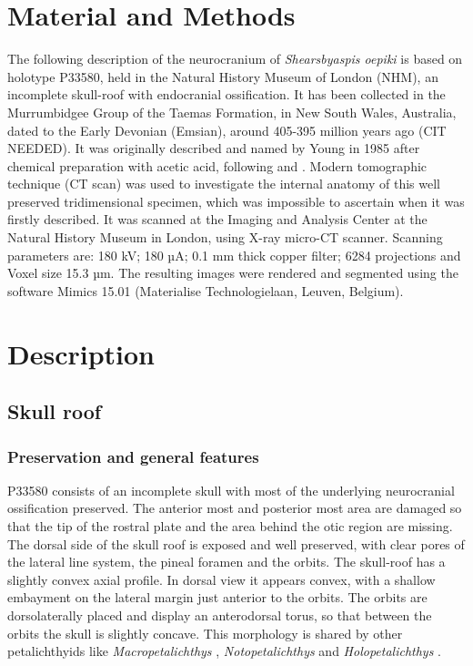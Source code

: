 \documentclass[12pt,letterpaper]{article}
\begin{document}
\section{Material and Methods}
The following description of the neurocranium of \textit{Shearsbyaspis oepiki} \citealt{Young1985} is based on holotype P33580, held in the Natural History Museum of London (NHM), an incomplete skull-roof with endocranial ossification. It has been collected in the Murrumbidgee Group of the Taemas Formation, in New South Wales, Australia, dated to the Early Devonian (Emsian), around 405-395 million years ago (CIT NEEDED). It  was originally described and named by Young in 1985 after chemical preparation with acetic acid, following \cite{Toombs1948} and \cite{Toombs1959}. 
Modern tomographic technique (CT scan) was used to investigate the internal anatomy of this well preserved tridimensional specimen, which was impossible to ascertain when it was firstly described. It was scanned at the Imaging and Analysis Center at the Natural History Museum in London, using X-ray micro-CT scanner. Scanning parameters are: 180 kV; 180 µA; 0.1 mm thick copper filter; 6284 projections and Voxel size 15.3 µm. The resulting images were rendered and segmented using the software Mimics 15.01 (Materialise Technologielaan, Leuven, Belgium).

\section{Description}
\subsection {Skull roof}
\subsubsection {Preservation and general features}

P33580 consists of an incomplete skull with most of the underlying neurocranial ossification preserved. The anterior most and posterior most area are damaged so that the tip of the rostral plate and the area behind the otic region are missing. The dorsal side of the skull roof is exposed and well preserved, with clear pores of the lateral line system, the pineal foramen and the orbits. 
The skull-roof has a slightly convex axial profile. In dorsal view it appears convex, with a shallow embayment on the lateral margin just anterior to the orbits. The orbits are dorsolaterally placed and display an anterodorsal torus, so that between the orbits the skull is slightly concave. This morphology is shared by other petalichthyids like \textit{Macropetalichthys} \citep{Stensi1925}, \textit{Notopetalichthys} \citep{Woodward1941} and \textit{Holopetalichthys} \citep{Zhu1996a}. 
\end{document}
